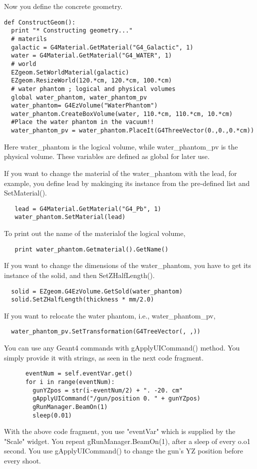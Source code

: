 \documentclass{article}
\begin{document}
Now you define the concrete geometry.

\begin{verbatim}
def ConstructGeom():
  print "* Constructing geometry..."
  # materils 
  galactic = G4Material.GetMaterial("G4_Galactic", 1)
  water = G4Material.GetMaterial("G4_WATER", 1)
  # world
  EZgeom.SetWorldMaterial(galactic)
  EZgeom.ResizeWorld(120.*cm, 120.*cm, 100.*cm)
  # water phantom ; logical and physical volumes
  global water_phantom, water_phantom_pv
  water_phantom= G4EzVolume("WaterPhantom")
  water_phantom.CreateBoxVolume(water, 110.*cm, 110.*cm, 10.*cm)
  #Place the water phantom in the vacuum!!
  water_phantom_pv = water_phantom.PlaceIt(G4ThreeVector(0.,0.,0.*cm))
\end{verbatim}

 Here water\_phantom is the logical volume, while water\_phantom\_pv is the
physical volume. These variables are defined as global for later use.

 If you want to change the material of the water\_phantom with the lead, for
example, you define lead by makinging its instance from the pre-defined list
and SetMaterial(). 

\begin{verbatim}
   lead = G4Material.GetMaterial("G4_Pb", 1)
   water_phantom.SetMaterial(lead)
\end{verbatim}

To print out the name of the materialof the logical volume,
\begin{verbatim} 
   print water_phantom.Getmaterial().GetName()
\end{verbatim}
 If you want to change the dimensions of the water\_phantom, you have to get 
its instance of the solid, and then SetZHalfLength().
\begin{verbatim}
  solid = EZgeom.G4EzVolume.GetSold(water_phantom)
  solid.SetZHalfLength(thickness * mm/2.0)
\end{verbatim}
If you want to relocate the water phantom, i.e., water\_phantom\_pv, 
\begin{verbatim}
  water_phantom_pv.SetTransformation(G4TreeVector(, ,))
\end{verbatim}

 You can use any Geant4 commands with gApplyUICommand() method.
You simply provide it with  strings, as seen in the next code fragment.
\begin{verbatim}
      eventNum = self.eventVar.get()
      for i in range(eventNum):
        gunYZpos = str(i-eventNum/2) + ". -20. cm"
        gApplyUICommand("/gun/position 0. " + gunYZpos)
        gRunManager.BeamOn(1)
        sleep(0.01)
\end{verbatim}
With the above code fragment, you use "eventVar" which is supplied by the
"Scale" widget. You repeat gRunManager.BeamOn(1), after a sleep of every
o.o1 second. You use gApplyUICommand() to change the gun's YZ position before
every shoot.
 
\end{document}
